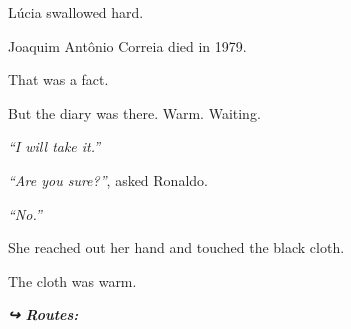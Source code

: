 \noindent Lúcia swallowed hard.

\noindent Joaquim Antônio Correia died in 1979.

\noindent That was a fact.

\noindent But the diary was there. Warm. Waiting.

\noindent \textit{\textquotedblleft{}I will take it.\textquotedblright{}}

\noindent \textit{\textquotedblleft{}Are you sure?\textquotedblright{}}, asked Ronaldo.

\noindent \textit{\textquotedblleft{}No.\textquotedblright{}}

\noindent She reached out her hand and touched the black cloth.

\noindent The cloth was warm.

\vspace{0.5em}
\noindent\textit{\textbf{↪ Routes:}  \rotasep {} \rotasep {}}
